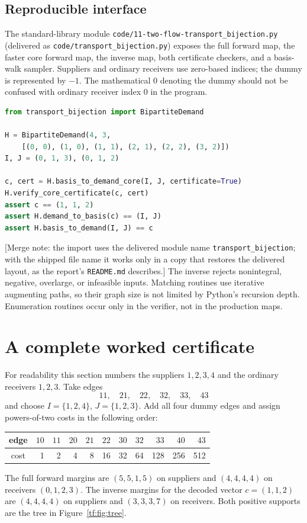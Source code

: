 \documentclass[11pt]{article}
\numberwithin{equation}{section}
\theoremstyle{definition}
\begin{document}
\subsection{Reproducible interface}
The standard-library module
\nolinkurl{code/11-two-flow-transport_bijection.py} (delivered as
\nolinkurl{code/transport_bijection.py}) exposes the full forward map,
the faster core forward map, the inverse map, both certificate checkers,
and a basis-walk sampler. Suppliers and ordinary receivers use zero-based
indices; the dummy is represented by $-1$. The mathematical $0$ denoting
the dummy should not be confused with ordinary receiver index $0$ in the
program.
\begin{lstlisting}[language=Python]
from transport_bijection import BipartiteDemand

H = BipartiteDemand(4, 3,
    [(0, 0), (1, 0), (1, 1), (2, 1), (2, 2), (3, 2)])
I, J = (0, 1, 3), (0, 1, 2)

c, cert = H.basis_to_demand_core(I, J, certificate=True)
H.verify_core_certificate(c, cert)
assert c == (1, 1, 2)
assert H.demand_to_basis(c) == (I, J)
assert H.basis_to_demand(I, J) == c
\end{lstlisting}
[Merge note: the import uses the delivered module name
\texttt{transport\_bijection}; with the shipped file name it works only in
a copy that restores the delivered layout, as the report's
\texttt{README.md} describes.]
The inverse rejects nonintegral, negative, overlarge, or infeasible
inputs. Matching routines use iterative augmenting paths, so their graph
size is not limited by Python's recursion depth. Enumeration routines
occur only in the verifier, not in the production maps.

\section{A complete worked certificate}
\label{tf:sec:example}
For readability this section numbers the suppliers $1,2,3,4$ and the
ordinary receivers $1,2,3$. Take edges
\[
 11,\quad21,\quad22,\quad32,\quad33,\quad43
\]
and choose $I=\{1,2,4\}$, $J=\{1,2,3\}$. Add all four dummy edges and
assign powers-of-two costs in the following order:
\begin{center}\small
\begin{tabular}{c|rrrrrrrrrr}
edge&$10$&$11$&$20$&$21$&$22$&$30$&$32$&$33$&$40$&$43$\\\hline
cost&1&2&4&8&16&32&64&128&256&512
\end{tabular}
\end{center}
The full forward margins are $(5,5,1,5)$ on suppliers and $(4,4,4,4)$
on receivers $(0,1,2,3)$. The inverse margins for the decoded vector
$c=(1,1,2)$ are $(4,4,4,4)$ on suppliers and $(3,3,3,7)$ on receivers.
Both positive supports are the tree in Figure~\ref{tf:fig:tree}.
\end{document}
